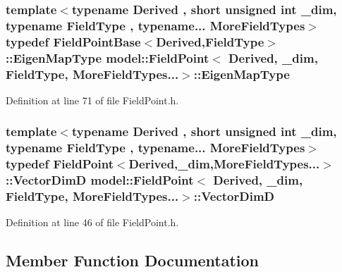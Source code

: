 \subsubsection[{Eigen\+Map\+Type}]{\setlength{\rightskip}{0pt plus 5cm}template$<$typename Derived , short unsigned int \+\_\+dim, typename Field\+Type , typename... More\+Field\+Types$>$ typedef {\bf Field\+Point\+Base}$<$Derived,Field\+Type$>$\+::{\bf Eigen\+Map\+Type} {\bf model\+::\+Field\+Point}$<$ Derived, \+\_\+dim, Field\+Type, More\+Field\+Types...$>$\+::{\bf Eigen\+Map\+Type}}\label{structmodel_1_1_field_point_3_01_derived_00_01__dim_00_01_field_type_00_01_more_field_types_8_8_8_4_a102f7ec843b150f0f63e8bea197a193a}


Definition at line 71 of file Field\+Point.\+h.

\hypertarget{structmodel_1_1_field_point_3_01_derived_00_01__dim_00_01_field_type_00_01_more_field_types_8_8_8_4_a2ef469cb0343605ab5118b31622e6bfe}{}
\subsubsection[{Vector\+Dim\+D}]{\setlength{\rightskip}{0pt plus 5cm}template$<$typename Derived , short unsigned int \+\_\+dim, typename Field\+Type , typename... More\+Field\+Types$>$ typedef {\bf Field\+Point}$<$Derived,\+\_\+dim,More\+Field\+Types...$>$\+::{\bf Vector\+Dim\+D} {\bf model\+::\+Field\+Point}$<$ Derived, \+\_\+dim, Field\+Type, More\+Field\+Types...$>$\+::{\bf Vector\+Dim\+D}}\label{structmodel_1_1_field_point_3_01_derived_00_01__dim_00_01_field_type_00_01_more_field_types_8_8_8_4_a2ef469cb0343605ab5118b31622e6bfe}


Definition at line 46 of file Field\+Point.\+h.



\subsection{Member Function Documentation}
\hypertarget{structmodel_1_1_field_point_3_01_derived_00_01__dim_00_01_field_type_00_01_more_field_types_8_8_8_4_a992db978cf1a09dacd25b09b879d2d30}{}
